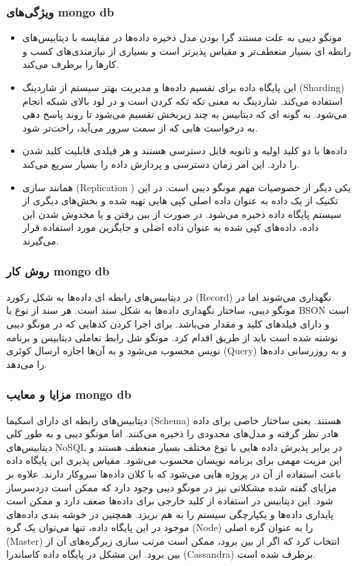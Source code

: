 \subsubsection{ویژگی‌های mongo db}
\begin{itemize}
	\item
مونگو دیبی به علت مستند گرا بودن مدل ذخیره داده‌ها در مقایسه با دیتابیس‌های رابطه ای بسیار منعطف‌تر و مقیاس پذیر‌تر است و بسیاری از نیازمندی‌های کسب و کارها را برطرف می‌کند.
\item
این پایگاه داده برای تقسیم داده‌ها و مدیریت بهتر سیستم از شاردینگ (Sharding) استفاده می‌کند. شاردینگ به معنی تکه تکه کردن است و در لود بالای شبکه انجام می‌شود. به گونه ای که دیتابیس به چند زیربخش تقسیم می‌شود تا روند پاسخ دهی به درخواست هایی که از سمت سرور می‌آید، راحت‌تر شود.
\item
داده‌ها با دو کلید اولیه و ثانویه قابل دسترسی هستند و هر فیلدی قابلیت کلید شدن را دارد. این امر زمان دسترسی و پردازش داده را بسیار سریع می‌کند.
\item
همانند سازی (Replication ) یکی دیگر از خصوصیات مهم مونگو دیبی است. در این تکنیک از یک داده به عنوان داده اصلی کپی هایی تهیه شده و بخش‌های دیگری از سیستم پایگاه داده ذخیره می‌شود. در صورت از بین رفتن و یا مخدوش شدن این داده، داده‌های کپی شده به عنوان داده اصلی و جایگزین مورد استفاده قرار می‌گیرند.
\end{itemize}

\subsubsection{روش کار mongo db}
در دیتابیس‌های رابطه ای داده‌ها به شکل رکورد (Record) نگهداری می‌شوند اما در مونگو دیبی، ساختار نگهداری داده‌ها به شکل سند است. هر سند از نوع
 یا BSON است و دارای فیلدهای کلید و مقدار می‌باشد.
برای اجرا کردن کدهایی که در مونگو دیبی نوشته شده است باید از طریق
 اقدام کرد. مونگو شل رابط تعاملی دیتابیس و برنامه نویس محسوب می‌شود و به آن‌ها اجازه ارسال کوئری (Query) و به روزرسانی داده‌ها را می‌دهد.

\subsubsection{مزایا و معایب mongo db}
دیتابیس‌های رابطه ای دارای اسکیما (Schema) هستند. یعنی ساختار خاصی برای داده هادر نظر گرفته و مدل‌های محدودی را ذخیره می‌کنند. اما مونگو دیبی و به طور کلی دیتابیس‌های NoSQL در برابر پذیرش داده هایی با توع مختلف بسیار منعطف هستند و این مزیت مهمی برای برنامه نویسان محسوب می‌شود. مقیاس پذیری این پایگاه داده باعث استفاده از آن در پروژه هایی می‌شود که با کلان داده‌ها
 سروکار دارند.
علاوه بر مزایای گفته شده مشکلاتی نیز در مونگو دیبی وجود دارد که ممکن است دردسرساز شود. این دیتابیس در استفاده از کلید خارجی
 برای داده‌ها ضعف دارد و ممکن است پایداری داده‌ها و یکپارچگی سیستم را به هم بریزد. همچنین در خوشه بندی داده‌های موجود در این پایگاه داده، تنها می‌توان یک گره (Node) را به عنوان گره اصلی (Master) انتخاب کرد که اگر از بین برود، ممکن است مرتب سازی زیرگره‌های آن از بین برود. این مشکل در پایگاه داده کاساندرا (Cassandra) برطرف شده است.


